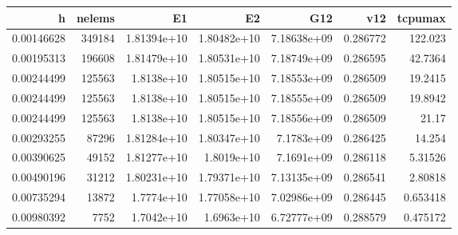\begin{tabular}{rrrrrrr}
h & nelems & E1 & E2 & G12 & v12 & tcpumax \\
\hline
0.00146628 & 349184 & 1.81394e+10 & 1.80482e+10 & 7.18638e+09 & 0.286772 & 122.023 \\
0.00195313 & 196608 & 1.81479e+10 & 1.80531e+10 & 7.18749e+09 & 0.286595 & 42.7364 \\
0.00244499 & 125563 & 1.8138e+10 & 1.80515e+10 & 7.18553e+09 & 0.286509 & 19.2415 \\
0.00244499 & 125563 & 1.8138e+10 & 1.80515e+10 & 7.18555e+09 & 0.286509 & 19.8942 \\
0.00244499 & 125563 & 1.8138e+10 & 1.80515e+10 & 7.18556e+09 & 0.286509 & 21.17 \\
0.00293255 & 87296 & 1.81284e+10 & 1.80347e+10 & 7.1783e+09 & 0.286425 & 14.254 \\
0.00390625 & 49152 & 1.81277e+10 & 1.8019e+10 & 7.1691e+09 & 0.286118 & 5.31526 \\
0.00490196 & 31212 & 1.80231e+10 & 1.79371e+10 & 7.13135e+09 & 0.286541 & 2.80818 \\
0.00735294 & 13872 & 1.7774e+10 & 1.77058e+10 & 7.02986e+09 & 0.286445 & 0.653418 \\
0.00980392 & 7752 & 1.7042e+10 & 1.6963e+10 & 6.72777e+09 & 0.288579 & 0.475172 \\
\end{tabular}